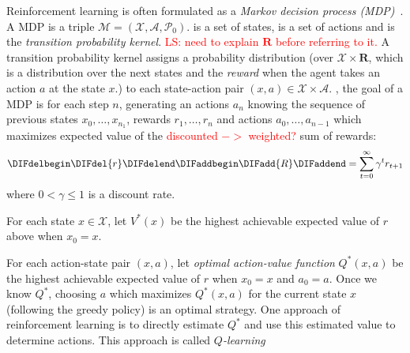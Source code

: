 Reinforcement learning is often formulated as a \emph{Markov decision process (MDP)}~\cite{Szepesvari2010}.
A MDP is a triple $\mathcal M = (\mathcal X, \mathcal A, \mathcal P_0)$.
\state is a set of states, \action is a set of actions and \probkernal is the \emph{transition probability kernel}.
\textcolor{red}{LS: need to explain $\mathbf R$ before referring to it.}
A transition probability kernel \probkernal assigns a probability distribution (over $\mathcal X \times \mathbf R$, which is a distribution over the next states and the \emph{reward} when the agent takes an action $a$ at the state $x$.) to each state-action pair $(x, a) \in \mathcal X \times \mathcal A$. 
\DIFdelbegin {}\DIFdelend \DIFaddbegin {}
\DIFaddend , the goal of a MDP is for each step $n$, generating an actions $a_n$ knowing the sequence of previous states $x_0, \ldots, x_{n_1}$, rewards $r_1, \ldots, r_{n}$ and actions $a_0, \ldots, a_{n-1}$ which maximizes expected value of the \textcolor{red}{discounted $->$ weighted?} sum of rewards:
\begin{equation}\DIFdelbegin \DIFdel{
  r }\DIFdelend \DIFaddbegin \DIFadd{
  R }\DIFaddend = \sum_{t = 0}^\infty \gamma^t r_{t+1}
\end{equation}
where $0 < \gamma \leq 1$ is a discount rate.
\DIFaddbegin 

\DIFaddend For each state $x \in \mathcal X$, let $V^*(x)$ be the highest achievable expected value of $r$ above when $x_0 = x$.
\DIFaddbegin {}

\DIFaddend For each action-state pair $(x, a)$, let \emph{optimal action-value function} $Q^*(x, a)$ be the highest achievable expected value of $r$ when $x_0 = x$ and $a_0 = a$.
Once we know $Q^*$, choosing $a$ which maximizes $Q^*(x, a)$ for the current state $x$ (following the greedy policy) is an optimal strategy.
One approach of reinforcement learning is to directly estimate $Q^*$ and use this estimated value to determine actions.
This approach is called \emph{$Q$-learning} \DIFdelbegin {}\DIFdelend \DIFaddbegin {}
\DIFaddend 

